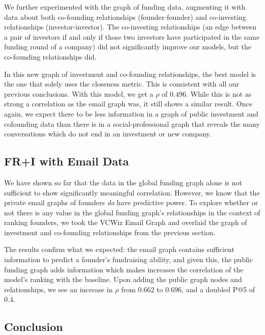 We further experimented with the graph of funding data, augmenting it with data about both co-founding relationships (founder-founder) and co-investing relationships (investor-investor). The co-investing relationships (an edge between a pair of investors if and only if those two investors have participated in the same funding round of a company) did not significantly improve our models, but the co-founding relationships did.

In this new graph of investment and co-founding relationships, the best model is the one that solely uses the closeness metric. This is consistent with all our previous conclusions. With this model, we get a $\rho$ of $0.496$. While this is not as strong a correlation as the email graph was, it still shows a similar result. Once again, we expect there to be less information in a graph of public investment and cofounding data than there is in a social-professional graph that reveals the many conversations which do not end in an investment or new company.

\subsection{FR+I with Email Data}

We have shown so far that the data in the global funding graph alone is not sufficient to show significantly meaningful correlation. However, we know that the private email graphs of founders \textit{do} have predictive power. To explore whether or not there is any value in the global funding graph's relationships in the context of ranking founders, we took the VCWiz Email Graph and overlaid the graph of investment and co-founding relationships from the previous section.

The results confirm what we expected: the email graph contains sufficient information to predict a founder's fundraising ability, and given this, the public funding graph adds information which makes increases the correlation of the model's ranking with the baseline. Upon adding the public graph nodes and relationships, we see an increase in $\rho$ from $0.662$ to $0.696$, and a doubled P@5 of $0.4$.

\subsection{Conclusion}

